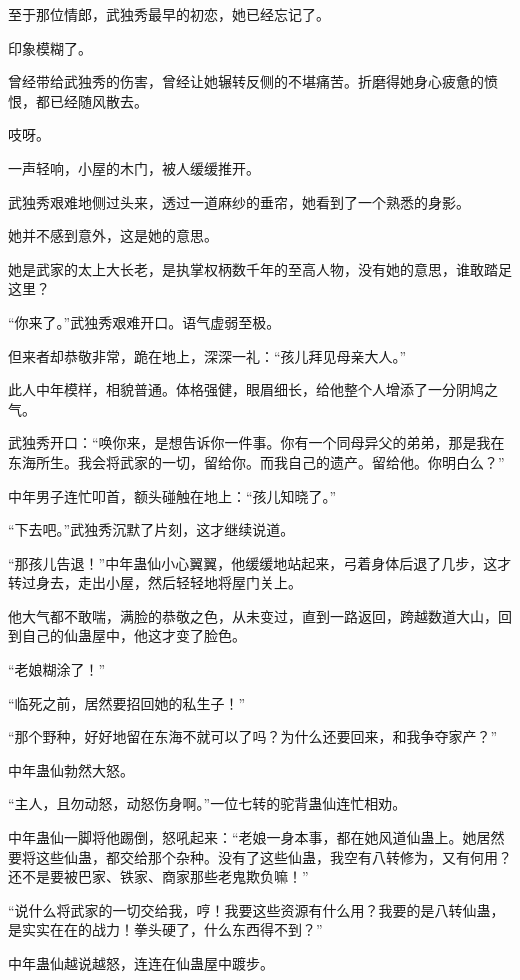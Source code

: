 \begin{this_body}
至于那位情郎，武独秀最早的初恋，她已经忘记了。

印象模糊了。

曾经带给武独秀的伤害，曾经让她辗转反侧的不堪痛苦。折磨得她身心疲惫的愤恨，都已经随风散去。

吱呀。

一声轻响，小屋的木门，被人缓缓推开。

武独秀艰难地侧过头来，透过一道麻纱的垂帘，她看到了一个熟悉的身影。

她并不感到意外，这是她的意思。

她是武家的太上大长老，是执掌权柄数千年的至高人物，没有她的意思，谁敢踏足这里？

“你来了。”武独秀艰难开口。语气虚弱至极。

但来者却恭敬非常，跪在地上，深深一礼：“孩儿拜见母亲大人。”

此人中年模样，相貌普通。体格强健，眼眉细长，给他整个人增添了一分阴鸠之气。

武独秀开口：“唤你来，是想告诉你一件事。你有一个同母异父的弟弟，那是我在东海所生。我会将武家的一切，留给你。而我自己的遗产。留给他。你明白么？”

中年男子连忙叩首，额头碰触在地上：“孩儿知晓了。”

“下去吧。”武独秀沉默了片刻，这才继续说道。

“那孩儿告退！”中年蛊仙小心翼翼，他缓缓地站起来，弓着身体后退了几步，这才转过身去，走出小屋，然后轻轻地将屋门关上。

他大气都不敢喘，满脸的恭敬之色，从未变过，直到一路返回，跨越数道大山，回到自己的仙蛊屋中，他这才变了脸色。

“老娘糊涂了！”

“临死之前，居然要招回她的私生子！”

“那个野种，好好地留在东海不就可以了吗？为什么还要回来，和我争夺家产？”

中年蛊仙勃然大怒。

“主人，且勿动怒，动怒伤身啊。”一位七转的驼背蛊仙连忙相劝。

中年蛊仙一脚将他踢倒，怒吼起来：“老娘一身本事，都在她风道仙蛊上。她居然要将这些仙蛊，都交给那个杂种。没有了这些仙蛊，我空有八转修为，又有何用？还不是要被巴家、铁家、商家那些老鬼欺负嘛！”

“说什么将武家的一切交给我，哼！我要这些资源有什么用？我要的是八转仙蛊，是实实在在的战力！拳头硬了，什么东西得不到？”

中年蛊仙越说越怒，连连在仙蛊屋中踱步。


\end{this_body}
